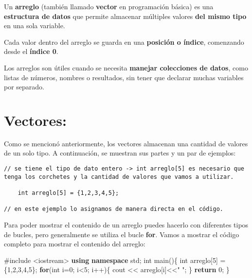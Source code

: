 \documentclass[
  11pt,
  a4paper,
  DIV=11,
  numbers=noendperiod]{scrreprt}
\newenvironment{Shaded}{\begin{snugshade}}{\end{snugshade}}
\newcommand{\ControlFlowTok}[1]{\textcolor[rgb]{0.00,0.23,0.31}{\textbf{#1}}}
\newcommand{\DataTypeTok}[1]{\textcolor[rgb]{0.68,0.00,0.00}{#1}}
\newcommand{\DecValTok}[1]{\textcolor[rgb]{0.68,0.00,0.00}{#1}}
\newcommand{\ImportTok}[1]{\textcolor[rgb]{0.00,0.46,0.62}{#1}}
\newcommand{\KeywordTok}[1]{\textcolor[rgb]{0.00,0.23,0.31}{\textbf{#1}}}
\newcommand{\NormalTok}[1]{\textcolor[rgb]{0.00,0.23,0.31}{#1}}
\newcommand{\OperatorTok}[1]{\textcolor[rgb]{0.37,0.37,0.37}{#1}}
\newcommand{\PreprocessorTok}[1]{\textcolor[rgb]{0.68,0.00,0.00}{#1}}
\newcommand{\StringTok}[1]{\textcolor[rgb]{0.13,0.47,0.30}{#1}}
\begin{document}
Un \textbf{arreglo} (también llamado \textbf{vector} en programación
básica) es una \textbf{estructura de datos} que permite almacenar
múltiples valores \textbf{del mismo tipo} en una sola variable.

Cada valor dentro del arreglo se guarda en una \textbf{posición o
índice}, comenzando desde el \textbf{índice 0}.

Los arreglos son útiles cuando se necesita \textbf{manejar colecciones
de datos}, como listas de números, nombres o resultados, sin tener que
declarar muchas variables por separado.

\section{Vectores:}\label{vectores}

Como se mencionó anteriormente, los vectores almacenan una cantidad de
valores de un solo tipo. A continuación, se muestran sus partes y un par
de ejemplos:

\begin{tcolorbox}[custombox]
\begin{verbatim}
// se tiene el tipo de dato entero -> int arreglo[5] es necesario que
tenga los corchetes y la cantidad de valores que vamos a utilizar.
    
    int arreglo[5] = {1,2,3,4,5}; 
    
// en este ejemplo lo asignamos de manera directa en el código.
\end{verbatim}
\end{tcolorbox}

Para poder mostrar el contenido de un arreglo puedes hacerlo con
diferentes tipos de bucles, pero generalmente se utiliza el bucle
\textbf{for}. Vamos a mostrar el código completo para mostrar el
contenido del arreglo:

\begin{Shaded}
\begin{Highlighting}[]
\PreprocessorTok{\#include }\ImportTok{\textless{}iostream\textgreater{}}
\KeywordTok{using} \KeywordTok{namespace}\NormalTok{ std}\OperatorTok{;}
\DataTypeTok{int}\NormalTok{ main}\OperatorTok{()\{}
    \DataTypeTok{int}\NormalTok{ arreglo}\OperatorTok{[}\DecValTok{5}\OperatorTok{]} \OperatorTok{=} \OperatorTok{\{}\DecValTok{1}\OperatorTok{,}\DecValTok{2}\OperatorTok{,}\DecValTok{3}\OperatorTok{,}\DecValTok{4}\OperatorTok{,}\DecValTok{5}\OperatorTok{\};}
    \ControlFlowTok{for}\OperatorTok{(}\DataTypeTok{int}\NormalTok{ i}\OperatorTok{=}\DecValTok{0}\OperatorTok{;}\NormalTok{ i}\OperatorTok{\textless{}}\DecValTok{5}\OperatorTok{;}\NormalTok{ i}\OperatorTok{++)\{}
\NormalTok{        cout }\OperatorTok{\textless{}\textless{}}\NormalTok{ arreglo}\OperatorTok{[}\NormalTok{i}\OperatorTok{]\textless{}\textless{}}\StringTok{" "}\OperatorTok{;}
    \OperatorTok{\}}
    \ControlFlowTok{return} \DecValTok{0}\OperatorTok{;}
\OperatorTok{\}}
\end{Highlighting}
\end{Shaded}
\end{document}
